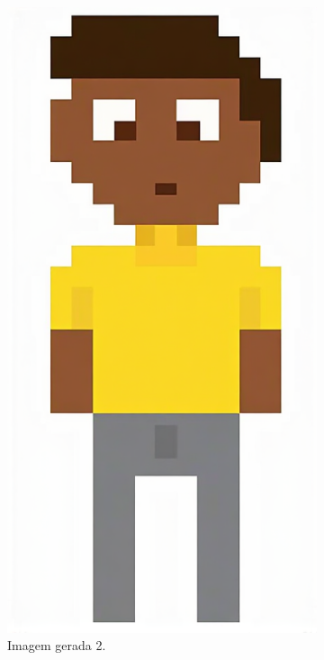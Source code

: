 \begin{figure}[htbp]
\begin{subfigure}{0.15\linewidth}
        \includegraphics[width=1\linewidth]{figs/cgDream/res_img_FluxFast1b.png}
        \caption{\small Imagem gerada 2.}
        \label{fig:cgDream3c}
    \end{subfigure}
    \begin{subfigure}{1\linewidth}

\end{subfigure}
\end{figure}
